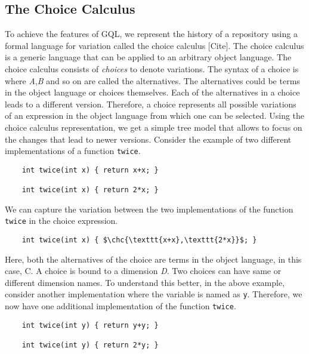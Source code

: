 \subsection{The Choice Calculus}

To achieve the features of GQL, we represent the history of a repository using a formal language for variation called the choice calculus [Cite]. The choice calculus is a generic language that can be applied to an arbitrary object language. The choice calculus consists of \textit{choices} to denote variations. The syntax of a choice is {} where \textit{A},\textit{B} and so on are called the alternatives. The alternatives could be terms in the object language or choices themselves. Each of the alternatives in a choice leads to a different version. Therefore, a choice represents all possible variations of an expression in the object language from which one can be selected. Using the choice calculus representation, we get a simple tree model that allows to focus on the changes that lead to newer versions.
Consider the example of two different implementations of a function \texttt{twice}.

\begin{lstlisting}
	int twice(int x) { return x+x; }
        
	int twice(int x) { return 2*x; }
\end{lstlisting}
        
We can capture the variation between the two implementations of the function \texttt{twice} in the choice expression.

\begin{lstlisting}
	int twice(int x) { $\chc{\texttt{x+x},\texttt{2*x}}$; }
\end{lstlisting}

Here, both the alternatives of the choice are terms in the object language, in this case, C.
A choice is bound to a dimension \textit{D}. Two choices can have same or different dimension names. To understand this better, in the above example, consider another implementation where the variable is named as \texttt{y}. Therefore, we now have one additional implementation of the function \texttt{twice}.

\begin{lstlisting}
	int twice(int y) { return y+y; }
        
	int twice(int y) { return 2*y; }
\end{lstlisting}        
        
